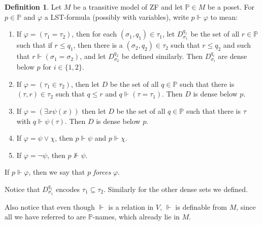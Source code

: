 \documentclass[12pt]{report}
\newcommand{\PP}{\mathbb{P}}
\newcommand{\dfn}[1]{\emph{#1}\index{#1}}
\theoremstyle{definition}
\newtheorem{definition}[theorem]{Definition}
\begin{document}
\begin{definition}
    Let $M$ be a transitive model of ZF and let $\PP \in M$ be a poset. For $p \in \PP$ and $\varphi$ a LST-formula (possibly with variables), write $p \Vdash \varphi$ to mean:
\begin{enumerate}
    \item If $\varphi = (\tau_1 = \tau_2)$, then for each $(\sigma_1, q_1) \in \tau_1$, let $D_{\sigma_1}^{q_1}$ be the set of all $r \in \PP$ such that if $r \leq q_1$, then there is a $(\sigma_2, q_2) \in \tau_2$ such that $r \leq q_2$ and such that $r \Vdash (\sigma_1 = \sigma_2)$, and let $D_{\sigma_2}^{q_2}$ be defined similarly. Then $D_{\sigma_i}^{q_i}$ are dense below $p$ for $i \in \{1, 2\}$.
    \item If $\varphi = (\tau_1 \in \tau_2)$, then let $D$ be the set of all $q \in \PP$ such that there is $(\tau, r) \in \tau_2$ such that $q \leq r$ and $q \Vdash (\tau = \tau_1)$. Then $D$ is dense below $p$.
    \item If $\varphi = (\exists x \psi(x))$ then let $D$ be the set of all $q \in \PP$ such that there is $\tau$ with $q \Vdash \psi(\tau)$. Then $D$ is dense below $p$.
    \item If $\varphi = \psi \vee \chi$, then $p \Vdash \psi$ and $p \Vdash \chi$.
    \item If $\varphi = \neg\psi$, then $p \not \Vdash \psi$.
\end{enumerate}
    If $p \Vdash \varphi$, then we say that $p$ \dfn{forces} $\varphi$.
\end{definition}
Notice that $D_{\sigma_1}^{q_1}$ encodes $\tau_1 \subseteq \tau_2$. Similarly for the other dense sets we defined.

Also notice that even though $\Vdash$ is a relation in $V$, $\Vdash$ is definable from $M$, since all we have referred to are $\PP$-names, which already lie in $M$.
\end{document}
